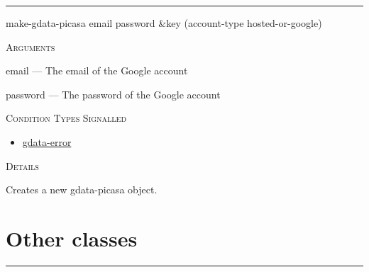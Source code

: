 \documentclass[a4paper]{report}
\begin{document}
  

    \rule{\linewidth}{0.1mm}
    
    \label{cl-gdata-picasa__fun__make-gdata-picasa}
    \begin{defun}[Function]
    make-gdata-picasa email password &key (account-type hosted-or-google)


    
    \bigskip
    \textsc{Arguments}

email
	--- The email of the Google account

password
	--- The password of the Google account




      
    \bigskip
    \textsc{Condition Types Signalled}


 	
    \begin{itemize}
    
	  
    \item
    \hyperref[cl-gdata-service__class__gdata-error]{gdata-error}
    
	
    \end{itemize}
  
      


	
    \bigskip
    \textsc{Details}

Creates a new gdata-picasa object.


    
    \end{defun}
  
  
      \section{Other classes}
      

    \rule{\linewidth}{0.1mm}
    
\end{document}
